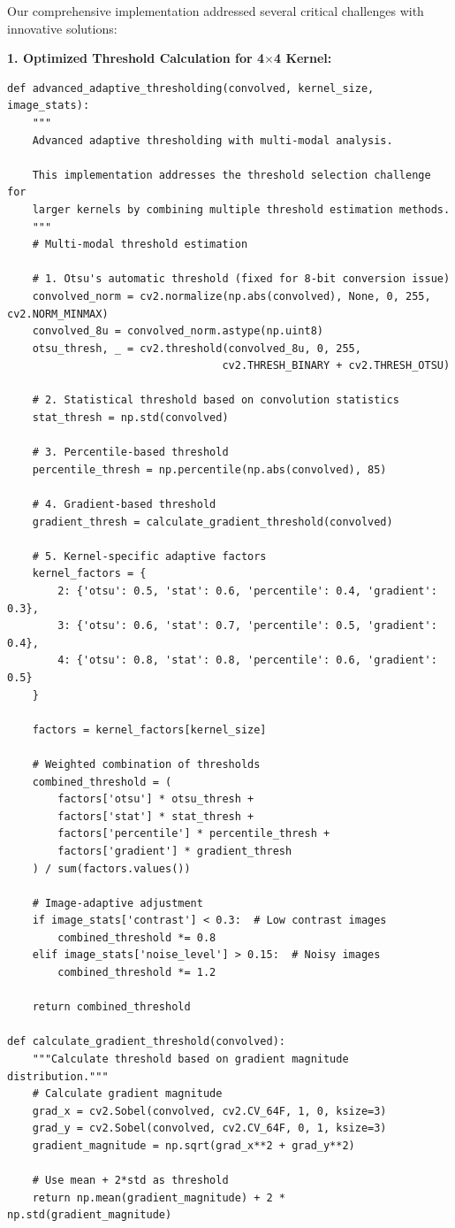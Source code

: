 \documentclass[conference]{IEEEtran}
\begin{document}
Our comprehensive implementation addressed several critical challenges with innovative solutions:

\textbf{1. Optimized Threshold Calculation for 4$\times$4 Kernel:}
\begin{lstlisting}[caption={Advanced adaptive thresholding solution with multi-modal analysis}]
def advanced_adaptive_thresholding(convolved, kernel_size, image_stats):
    """
    Advanced adaptive thresholding with multi-modal analysis.
    
    This implementation addresses the threshold selection challenge for
    larger kernels by combining multiple threshold estimation methods.
    """
    # Multi-modal threshold estimation
    
    # 1. Otsu's automatic threshold (fixed for 8-bit conversion issue)
    convolved_norm = cv2.normalize(np.abs(convolved), None, 0, 255, cv2.NORM_MINMAX)
    convolved_8u = convolved_norm.astype(np.uint8)
    otsu_thresh, _ = cv2.threshold(convolved_8u, 0, 255, 
                                  cv2.THRESH_BINARY + cv2.THRESH_OTSU)
    
    # 2. Statistical threshold based on convolution statistics
    stat_thresh = np.std(convolved)
    
    # 3. Percentile-based threshold
    percentile_thresh = np.percentile(np.abs(convolved), 85)
    
    # 4. Gradient-based threshold
    gradient_thresh = calculate_gradient_threshold(convolved)
    
    # 5. Kernel-specific adaptive factors
    kernel_factors = {
        2: {'otsu': 0.5, 'stat': 0.6, 'percentile': 0.4, 'gradient': 0.3},
        3: {'otsu': 0.6, 'stat': 0.7, 'percentile': 0.5, 'gradient': 0.4},
        4: {'otsu': 0.8, 'stat': 0.8, 'percentile': 0.6, 'gradient': 0.5}
    }
    
    factors = kernel_factors[kernel_size]
    
    # Weighted combination of thresholds
    combined_threshold = (
        factors['otsu'] * otsu_thresh +
        factors['stat'] * stat_thresh +
        factors['percentile'] * percentile_thresh +
        factors['gradient'] * gradient_thresh
    ) / sum(factors.values())
    
    # Image-adaptive adjustment
    if image_stats['contrast'] < 0.3:  # Low contrast images
        combined_threshold *= 0.8
    elif image_stats['noise_level'] > 0.15:  # Noisy images
        combined_threshold *= 1.2
    
    return combined_threshold

def calculate_gradient_threshold(convolved):
    """Calculate threshold based on gradient magnitude distribution."""
    # Calculate gradient magnitude
    grad_x = cv2.Sobel(convolved, cv2.CV_64F, 1, 0, ksize=3)
    grad_y = cv2.Sobel(convolved, cv2.CV_64F, 0, 1, ksize=3)
    gradient_magnitude = np.sqrt(grad_x**2 + grad_y**2)
    
    # Use mean + 2*std as threshold
    return np.mean(gradient_magnitude) + 2 * np.std(gradient_magnitude)
\end{lstlisting}
\end{document}

